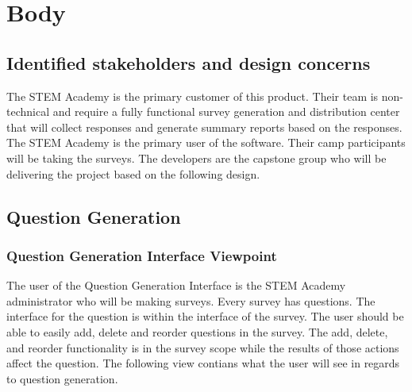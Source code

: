 \documentclass[letterpaper,10pt,serif, draftclsnofoot,onecolumn, compsoc, titlepage]{IEEEtran}
\begin{document}
\section{Body}
\subsection{Identified stakeholders and design concerns}
The STEM Academy is the primary customer of this product. Their team is non-technical and require a fully functional survey generation and distribution center that will collect responses and generate summary reports based on the responses. The STEM Academy is the primary user of the software. Their camp participants will be taking the surveys. The developers are the capstone 
group who will be delivering the project based on the following design.

\subsection{Question Generation}

\subsubsection{Question Generation Interface Viewpoint}
The user of the Question Generation Interface is the STEM Academy administrator who will be making surveys. Every survey has
questions. The interface for the question is within the interface of the survey. The user should be able to easily add, delete and 
reorder questions in the survey. The add, delete, and reorder functionality is in the survey scope while the results of those actions
affect the question. The following view contians what the user will see in regards to question generation. 
\end{document}
